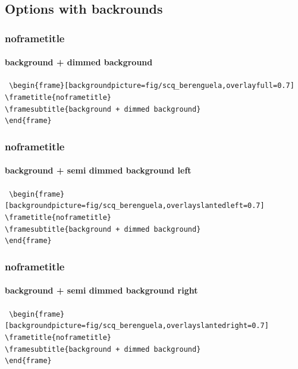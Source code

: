 \documentclass[aspectratio=169]{beamer}
\begin{document}
\subsection{Options with backrounds}
\begin{frame}[backgroundpicture=fig/scq_berenguela,overlayfull=0.7]
\frametitle{noframetitle}
\framesubtitle{background + dimmed background}

\texttt{%
\textbackslash begin\{frame\}[backgroundpicture=fig/scq\_berenguela,overlayfull=0.7]\\%
\textbackslash frametitle\{noframetitle\}\\
\textbackslash framesubtitle\{background + dimmed background\}\\
\textbackslash end\{frame\}%
}

\end{frame}



\begin{frame}[backgroundpicture=fig/scq_berenguela,overlayslantedleft=0.7]
\frametitle{noframetitle}
\framesubtitle{background + semi dimmed background left}

\texttt{%
\textbackslash begin\{frame\}[backgroundpicture=fig/scq\_berenguela,overlayslantedleft=0.7]\\%
\textbackslash frametitle\{noframetitle\}\\
\textbackslash framesubtitle\{background + dimmed background\}\\
\textbackslash end\{frame\}%
}

\end{frame}



\begin{frame}[backgroundpicture=fig/scq_berenguela,overlayslantedright=0.7]
\frametitle{noframetitle}
\framesubtitle{background + semi dimmed background right}

\texttt{%
\textbackslash begin\{frame\}[backgroundpicture=fig/scq\_berenguela,overlayslantedright=0.7]\\%
\textbackslash frametitle\{noframetitle\}\\
\textbackslash framesubtitle\{background + dimmed background\}\\
\textbackslash end\{frame\}%
}

\end{frame}
\end{document}
